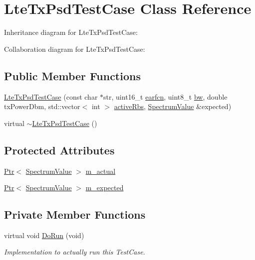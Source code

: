 \hypertarget{classLteTxPsdTestCase}{}\section{Lte\+Tx\+Psd\+Test\+Case Class Reference}
\label{classLteTxPsdTestCase}


Inheritance diagram for Lte\+Tx\+Psd\+Test\+Case\+:


Collaboration diagram for Lte\+Tx\+Psd\+Test\+Case\+:
\subsection*{Public Member Functions}
\begin{DoxyCompactItemize}
\item 
\hyperlink{classLteTxPsdTestCase_ae26a15256d729af8f92d116584ce3272}{Lte\+Tx\+Psd\+Test\+Case} (const char $\ast$str, uint16\+\_\+t \hyperlink{generate__test__data__lte__spectrum__value__txpsd_8m_a584be7562abb392609629331f8c6c42c}{earfcn}, uint8\+\_\+t \hyperlink{lte__ue__measurements_8m_a3f7228a3941f19f282647a09dd494528}{bw}, double tx\+Power\+Dbm, std\+::vector$<$ int $>$ \hyperlink{generate__test__data__lte__spectrum__value__txpsd_8m_a24a77723355dffcf07f2679649d46828}{active\+Rbs}, \hyperlink{classns3_1_1SpectrumValue}{Spectrum\+Value} \&expected)
\item 
virtual \hyperlink{classLteTxPsdTestCase_ac55ca7b9a238a53803c1121a3c8641e3}{$\sim$\+Lte\+Tx\+Psd\+Test\+Case} ()
\end{DoxyCompactItemize}
\subsection*{Protected Attributes}
\begin{DoxyCompactItemize}
\item 
\hyperlink{classns3_1_1Ptr}{Ptr}$<$ \hyperlink{classns3_1_1SpectrumValue}{Spectrum\+Value} $>$ \hyperlink{classLteTxPsdTestCase_a2eb0a26ccc92a084294f720ff26636ca}{m\+\_\+actual}
\item 
\hyperlink{classns3_1_1Ptr}{Ptr}$<$ \hyperlink{classns3_1_1SpectrumValue}{Spectrum\+Value} $>$ \hyperlink{classLteTxPsdTestCase_a70608bd572943322beb8cf9092da25a8}{m\+\_\+expected}
\end{DoxyCompactItemize}
\subsection*{Private Member Functions}
\begin{DoxyCompactItemize}
\item 
virtual void \hyperlink{classLteTxPsdTestCase_a6688f58cd64eae18385e906dd3734ef1}{Do\+Run} (void)
\begin{DoxyCompactList}\small\item\em Implementation to actually run this Test\+Case. \end{DoxyCompactList}\end{DoxyCompactItemize}
